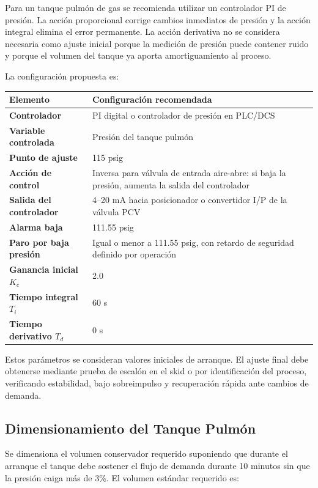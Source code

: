 \documentclass[12pt,letterpaper]{article}
\begin{document}
Para un tanque pulmón de gas se recomienda utilizar un controlador PI de presión. La acción proporcional corrige cambios inmediatos de presión y la acción integral elimina el error permanente. La acción derivativa no se considera necesaria como ajuste inicial porque la medición de presión puede contener ruido y porque el volumen del tanque ya aporta amortiguamiento al proceso.

La configuración propuesta es:

\begin{center}
\begin{tabular}{>{\bfseries}p{4.4cm} p{8.4cm}}
\toprule
\textbf{Elemento} & \textbf{Configuración recomendada} \\
\midrule
Controlador & PI digital o controlador de presión en PLC/DCS \\
Variable controlada & Presión del tanque pulmón \\
Punto de ajuste & 115 psig \\
Acción de control & Inversa para válvula de entrada aire-abre: si baja la presión, aumenta la salida del controlador \\
Salida del controlador & 4--20 mA hacia posicionador o convertidor I/P de la válvula PCV \\
Alarma baja & 111.55 psig \\
Paro por baja presión & Igual o menor a 111.55 psig, con retardo de seguridad definido por operación \\
Ganancia inicial $K_c$ & 2.0 \\
Tiempo integral $T_i$ & 60 s \\
Tiempo derivativo $T_d$ & 0 s \\
\bottomrule
\end{tabular}
\end{center}

Estos parámetros se consideran valores iniciales de arranque. El ajuste final debe obtenerse mediante prueba de escalón en el skid o por identificación del proceso, verificando estabilidad, bajo sobreimpulso y recuperación rápida ante cambios de demanda.

\subsection*{Dimensionamiento del Tanque Pulmón}

Se dimensiona el volumen conservador requerido suponiendo que durante el arranque el tanque debe sostener el flujo de demanda durante 10 minutos sin que la presión caiga más de 3\%. El volumen estándar requerido es:
\end{document}
